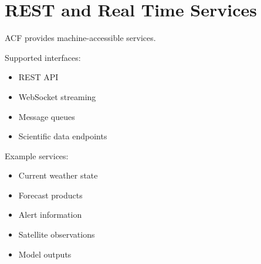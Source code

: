 \section{REST and Real Time Services}


ACF provides machine-accessible services.



Supported interfaces:


\begin{itemize}

\item REST API

\item WebSocket streaming

\item Message queues

\item Scientific data endpoints

\end{itemize}



Example services:


\begin{itemize}

\item Current weather state

\item Forecast products

\item Alert information

\item Satellite observations

\item Model outputs

\end{itemize}
